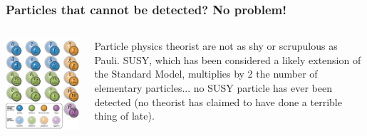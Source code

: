 \begin{frame}
\frametitle{Particles that cannot be detected? No problem!}

\begin{columns}
\includegraphics[scale=0.25]{img/susy.jpg}
 

Particle physics theorist are not as shy or scrupulous as Pauli. SUSY, which has been considered a likely extension of the Standard Model, multiplies by 2 the number of elementary particles... no SUSY particle has ever been detected (no theorist has claimed to have done a terrible thing of late). 


\end{columns}
\end{frame}

